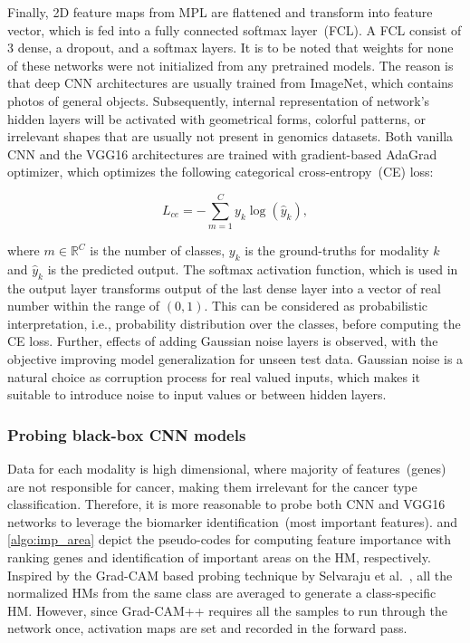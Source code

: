 \hspace*{3.5mm} Finally, 2D feature maps from MPL are flattened and transform into feature vector, which is fed into a fully connected softmax layer~(FCL). A FCL consist of 3 dense, a dropout, and a softmax layers. It is to be noted that weights for none of these networks were not initialized from any pretrained models. The reason is that deep CNN architectures are usually trained from ImageNet, which contains photos of general objects. Subsequently, internal representation of network's hidden layers will be activated with geometrical forms, colorful patterns, or irrelevant shapes that are usually not present in genomics datasets. Both vanilla CNN and the VGG16 architectures are trained with gradient-based AdaGrad optimizer, which optimizes the following categorical cross-entropy~(CE) loss: 

\begin{equation} 
    L_{ce}=-\sum_{m=1}^{C} y_{k} \log \left(\hat{y}_{k}\right) \label{eq:ce_loss_function},
\end{equation} 

\hspace*{3.5mm} where $m \in \mathbb{R}^{C}$ is the number of classes, $y_{k}$ is the ground-truths for modality $k$ and $\hat{y}_{k}$ is the predicted output. The softmax activation function, which is used in the output layer transforms output of the last dense layer into a vector of real number within the range of $\left(0,1\right)$. This can be considered as probabilistic interpretation, i.e., probability distribution over the classes, before computing the CE loss. Further, effects of adding Gaussian noise layers is observed, with the objective improving model generalization for unseen test data. Gaussian noise is a natural choice as corruption process for real valued inputs, which makes it suitable to introduce noise to input values or between hidden layers. 


\subsubsection{Probing black-box CNN models}
Data for each modality is high dimensional, where majority of features~(genes) are not responsible for cancer, making them irrelevant for the cancer type classification. Therefore, it is more reasonable to probe both CNN and VGG16 networks to leverage the biomarker identification~(most important features).  and \ref{algo:imp_area} depict the pseudo-codes for computing feature importance with ranking genes and identification of important areas on the HM, respectively. Inspired by the Grad-CAM based probing technique by Selvaraju et al.~\cite{mostavi2019convolutional}, all the normalized HMs from the same class are averaged to generate a class-specific HM. However, since Grad-CAM++ requires all the samples to run through the network once, activation maps are set and recorded in the forward pass. 


